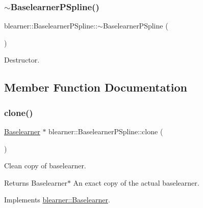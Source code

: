 \subsubsection{\texorpdfstring{$\sim$\+Baselearner\+P\+Spline()}{~BaselearnerPSpline()}}
{\footnotesize\ttfamily blearner\+::\+Baselearner\+P\+Spline\+::$\sim$\+Baselearner\+P\+Spline (\begin{DoxyParamCaption}{ }\end{DoxyParamCaption})}



Destructor. 



\subsection{Member Function Documentation}
\mbox{\label{classblearner_1_1_baselearner_p_spline_aea7d3c0ef6d77ffb8a2fb2000fae6399}} 
\subsubsection{\texorpdfstring{clone()}{clone()}}
{\footnotesize\ttfamily \mbox{\hyperlink{classblearner_1_1_baselearner}{Baselearner}} $\ast$ blearner\+::\+Baselearner\+P\+Spline\+::clone (\begin{DoxyParamCaption}{ }\end{DoxyParamCaption})\hspace{0.3cm}{\ttfamily [virtual]}}



Clean copy of baselearner. 

\begin{DoxyReturn}{Returns}
{\ttfamily Baselearner$\ast$} An exact copy of the actual baselearner. 
\end{DoxyReturn}


Implements \mbox{\hyperlink{classblearner_1_1_baselearner_a8e12c6739f085917a7d2da6570c51a21}{blearner\+::\+Baselearner}}.

